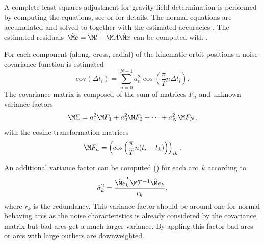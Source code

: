 A complete least squares adjustment for gravity field determination is performed by computing the 
equations, see  or
 for details. The normal equations
are accumulated and solved to  together with the estimated accuracies
. The estimated residuals~$\hat{\M e}=\M l-\M A\hat{\M x}$ can be computed with
.

For each component (along, cross, radial) of the kinematic orbit positions a noise covariance function is estimated
\begin{equation}
  \text{cov}(\Delta t_i) = \sum_{n=0}^{N-1} a_n^2 \cos\left(\frac{\pi}{T} n\Delta t_i\right).
\end{equation}
The covariance matrix is composed of the sum of matrices $F_n$ and unknown variance factors
\begin{equation}
  \M\Sigma = a_1^2\M F_1 + a_2^2 \M F_2 + \cdots + a_N^2\M F_N,
\end{equation}
with the cosine transformation matrices
\begin{equation}
  \M F_n = \left(\cos\left(\frac{\pi}{T} n(t_i-t_k)\right)\right)_{ik}.
\end{equation}

An additional variance factor can be computed () for each arc~$k$  according to
\begin{equation}
  \hat{\sigma}_k^2 = \frac{\hat{\M e}_k^T\M\Sigma^{-1}\hat{\M e}_k}{r_k},
\end{equation}
where $r_k$ is the redundancy. This variance factor should be around one for normal behaving arcs
as the noise characteristics is already considered by the covariance matrix but bad arcs get a much larger variance.
By appling this factor bad arcs or arcs with large outliers are downweighted.


